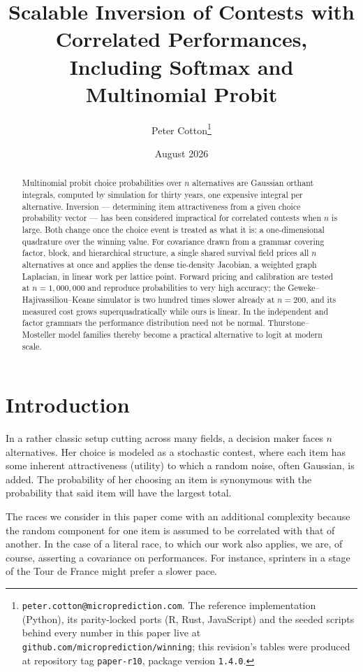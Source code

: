 \documentclass[11pt]{article}
\title{Scalable Inversion of Contests with Correlated Performances,\\
Including Softmax and Multinomial Probit}
\author{Peter Cotton\thanks{\texttt{peter.cotton@microprediction.com}. The reference
implementation (Python), its parity-locked ports (R, Rust, JavaScript) and the seeded
scripts behind every number in this paper live at
\texttt{github.com/microprediction/winning}; this revision's tables were
produced at repository tag \texttt{paper-r10}, package version
\texttt{1.4.0}.}}
\date{August 2026}
\begin{document}
\maketitle

\begin{abstract}
Multinomial probit choice probabilities over $n$ alternatives are
Gaussian orthant integrals, computed by simulation for thirty years, one
expensive integral per alternative. Inversion --- determining item
attractiveness from a given choice probability vector --- has been
considered impractical for correlated contests when $n$ is large. Both
change once the choice event is treated as what it is: a one-dimensional
quadrature over the winning value. For covariance drawn from a grammar
covering factor, block, and hierarchical structure, a single shared
survival field prices all $n$ alternatives at once and applies the dense
tie-density Jacobian, a weighted graph Laplacian, in linear work per
lattice point. Forward pricing and calibration are tested at
$n=1{,}000{,}000$ and reproduce probabilities to very high accuracy; the
Geweke--Hajivassiliou--Keane simulator is two hundred times slower
already at $n=200$, and its measured cost grows superquadratically while
ours is linear. In the independent and factor grammars the performance
distribution need not be normal. Thurstone--Mosteller model families
thereby become a practical alternative to logit at modern scale.
\end{abstract}

\section{Introduction}\label{sec:intro}

In a rather classic setup cutting across many fields, a decision maker faces $n$ alternatives. Her choice is modeled as a stochastic contest, where each item has some inherent attractiveness (utility) to which a random noise, often Gaussian, is added. The probability of her choosing an item is synonymous with the probability that said item will have the largest total.

The races we consider in this paper come with an additional complexity because the random component for one item is assumed to be correlated with that of another. In the case of a literal race, to which our work also applies, we are, of course, asserting a covariance on performances. For instance, sprinters in a stage of the Tour de France might prefer a slower pace.
\end{document}
